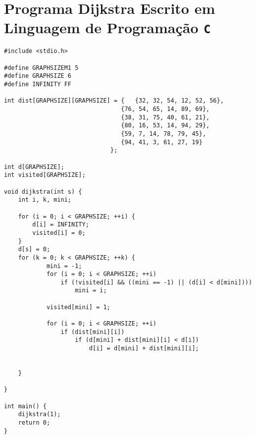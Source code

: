 


\section{Programa Dijkstra Escrito em Linguagem de Programação \texttt{C}}

\scriptsize
\begin{verbatim}
#include <stdio.h>

#define GRAPHSIZEM1 5
#define GRAPHSIZE 6
#define INFINITY FF

int dist[GRAPHSIZE][GRAPHSIZE] = {   {32, 32, 54, 12, 52, 56},
                                 {76, 54, 65, 14, 89, 69},
                                 {38, 31, 75, 40, 61, 21},
                                 {80, 16, 53, 14, 94, 29},
                                 {59, 7, 14, 78, 79, 45}, 
                                 {94, 41, 3, 61, 27, 19} 
                              };   

int d[GRAPHSIZE];
int visited[GRAPHSIZE];

void dijkstra(int s) {
    int i, k, mini;

    for (i = 0; i < GRAPHSIZE; ++i) {
        d[i] = INFINITY;
        visited[i] = 0;
    }
    d[s] = 0;
    for (k = 0; k < GRAPHSIZE; ++k) {
            mini = -1;
            for (i = 0; i < GRAPHSIZE; ++i)
                if (!visited[i] && ((mini == -1) || (d[i] < d[mini])))
	                mini = i;

            visited[mini] = 1;

            for (i = 0; i < GRAPHSIZE; ++i)
                if (dist[mini][i])
	                if (d[mini] + dist[mini][i] < d[i]) 
		                d[i] = d[mini] + dist[mini][i];

       
    }
   
}

int main() {
	dijkstra(1);
	return 0;
}

\end{verbatim}

